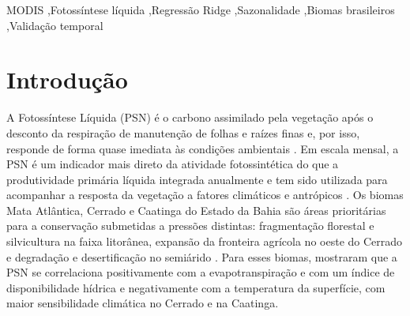\documentclass[a4paper,fleqn]{cas-dc}
\begin{document}
\begin{keywords}
MODIS \sep Fotossíntese líquida \sep Regressão Ridge \sep Sazonalidade \sep Biomas brasileiros \sep Validação temporal
\end{keywords}

\maketitle

\section{Introdução}\label{sec:intro}

A Fotossíntese Líquida (PSN) é o carbono assimilado pela vegetação após o desconto da respiração de manutenção de folhas e raízes finas e, por isso, responde de forma quase imediata às condições ambientais \citep{running2004,running2021gpp}. Em escala mensal, a PSN é um indicador mais direto da atividade fotossintética do que a produtividade primária líquida integrada anualmente e tem sido utilizada para acompanhar a resposta da vegetação a fatores climáticos e antrópicos \citep{nemani2003,benfica2023}. Os biomas Mata Atlântica, Cerrado e Caatinga do Estado da Bahia são áreas prioritárias para a conservação submetidas a pressões distintas: fragmentação florestal e silvicultura na faixa litorânea, expansão da fronteira agrícola no oeste do Cerrado e degradação e desertificação no semiárido \citep{ribeiro2009,lima2020,marengo2018,mapbiomas2025}. Para esses biomas, \citet{benfica2022,benfica2023} mostraram que a PSN se correlaciona positivamente com a evapotranspiração e com um índice de disponibilidade hídrica e negativamente com a temperatura da superfície, com maior sensibilidade climática no Cerrado e na Caatinga.
\end{document}
